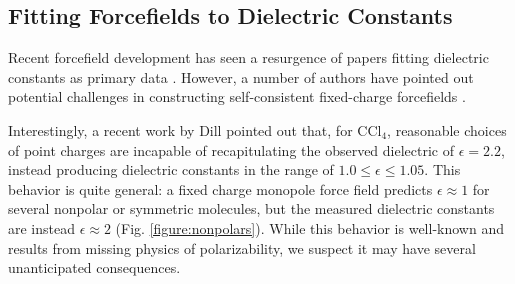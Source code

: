 \documentclass[aps,pre,twocolumn,nofootinbib,superscriptaddress,linenumbers]{revtex4-1}
\begin{document}

\subsection{Fitting Forcefields to Dielectric Constants}

Recent forcefield development has seen a resurgence of papers fitting dielectric constants as primary data \cite{wang2014building, fennell2014fixed}.  
However, a number of authors have pointed out potential challenges in constructing self-consistent fixed-charge forcefields \cite{fennell2012simple, leontyev2014polarizable}.  


Interestingly, a recent work by Dill \cite{fennell2012simple} pointed out that, for $\mathrm{CCl_4}$, reasonable choices of point charges are incapable of recapitulating the observed dielectric of $\epsilon = 2.2$, instead producing dielectric constants in the range of $1.0 \le \epsilon \le 1.05$.  
This behavior is quite general: a fixed charge monopole force field predicts $\epsilon \approx 1$ for several nonpolar or symmetric molecules, but the measured dielectric constants are instead $\epsilon \approx 2$ (Fig. \ref{figure:nonpolars}).  
While this behavior is well-known and results from missing physics of polarizability, we suspect it may have several unanticipated consequences.

\end{document}
